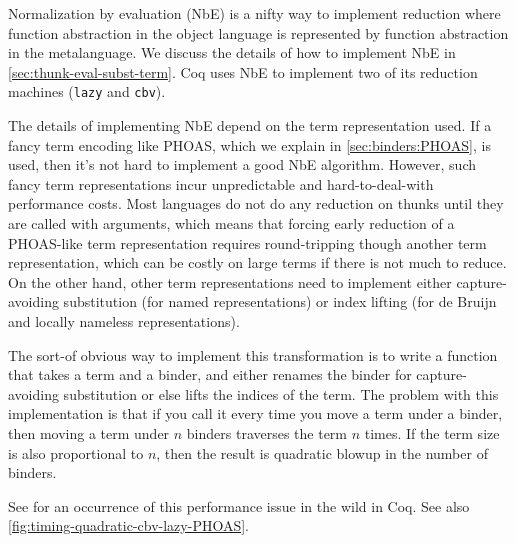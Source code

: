 Normalization by evaluation (NbE) is a nifty way to implement reduction where function abstraction in the object language is represented by function abstraction in the metalanguage.
We discuss the details of how to implement NbE in \autoref{sec:thunk-eval-subst-term}.
Coq uses NbE to implement two of its reduction machines (\texttt{lazy} and \texttt{cbv}).

The details of implementing NbE depend on the term representation used.
If a fancy term encoding like PHOAS, which we explain in \autoref{sec:binders:PHOAS}, is used, then it's not hard to implement a good NbE algorithm.
However, such fancy term representations incur unpredictable and hard-to-deal-with performance costs.
Most languages do not do any reduction on thunks until they are called with arguments, which means that forcing early reduction of a PHOAS-like term representation requires round-tripping though another term representation, which can be costly on large terms if there is not much to reduce.
On the other hand, other term representations need to implement either capture-avoiding substitution (for named representations) or index lifting (for de Bruijn and locally nameless representations).

The sort-of obvious way to implement this transformation is to write a function that takes a term and a binder, and either renames the binder for capture-avoiding substitution or else lifts the indices of the term.
The problem with this implementation is that if you call it every time you move a term under a binder, then moving a term under $n$ binders traverses the term $n$ times.
If the term size is also proportional to $n$, then the result is quadratic blowup in the number of binders.

See  for an occurrence of this performance issue in the wild in Coq.
See also \autoref{fig:timing-quadratic-cbv-lazy-PHOAS}.


